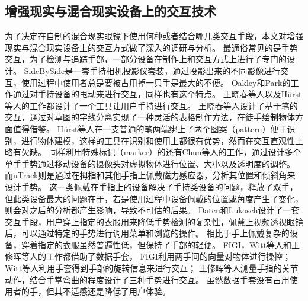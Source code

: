\subsection{增强现实与混合现实设备上的交互技术}
\label{sec:related-jiaohu}
为了决定在自制的混合现实眼镜下使用何种或者结合哪几类交互手段，本文对增强现实与混合现实设备上的交互方式做了深入的调研与分析。
最通俗常见的是手势交互，为了检测与追踪手部，一部分设备在制作上和交互方式上进行了专门的设计。
SideBySide是一套手持相机投影仪套装，通过投影出来的不同影像进行交互，使用过程中使用者总是要被占用掉一只手是最大的不便。
Oakley和Park的工作通过对手持设备的甩动来进行交互，同样也有这个特点。
王晓春等人以及H{\"u}rst等人的工作都设计了一个工具让用户手持进行交互。
王晓春等人设计了基于笔的交互，通过对草图的字线分离实现了一种灵活的表格制作方法，在徒手绘制物体方面值得借鉴。
H{\"u}rst等人在一支普通的笔两端绑上了两个图案（pattern）便于识别，进行物体建模，这样的工具在识别和使用上都很有优势，然而在交互直观性上略有欠缺。
同样利用特殊标记（marker）的还有Chun等人的工作，通过设计多个单手手势通过移动设备的摄像头对虚拟物体进行位置、大小以及透明度的调整。
而uTrack则是通过在拇指和其他手指上佩戴磁力感应器，分析其位置和倾斜角来设计手势。
这一类佩戴在手指上的设备解决了手持类设备的问题，释放了双手，但此类设备最大的问题在于，若是使用过程中设备佩戴的位置或角度产生了变化，则会对之后的分析都产生影响，导致不可估的后果。
Datcu和Lukosch设计了一套交互手段，用户穿上指定的衣服用来降低手势检测的复杂性，佩戴上视频透视眼镜后，可以通过特定的手势进行调用菜单和浏览的操作。
相比于手上佩戴复杂的设备，穿着指定的衣服虽然普遍性低，但保持了手部的轻便。
FIGI，Witt等人和王修晖等人的工作都借助了数据手套，
FIGI利用两手间的向量对物体进行操控；
Witt等人利用手套得到手部的旋转信息来进行交互；
王修晖等人测量手指的关节动作，结合手掌弯曲的程度设计了三种手势进行交互。
虽然数据手套没有占用使用者的手，但其不适感还是降低了用户体验。

